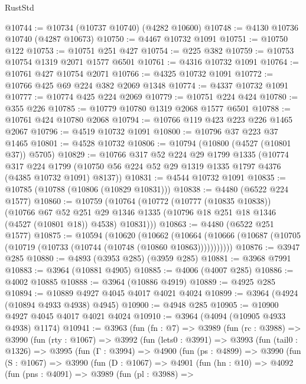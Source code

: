\begin{lexlean}{RustStd}
\begin{coremodule}
{\begin{coremodule}
{{{{{{{{{{{{{{{{{{{{{{{{{{{{{{{{{{{{{{@10744 := @10734 (@10737 @10740) (@4282 @10600)
@10748 := @4130 @10736 @10740 (@4287 @10673)
@10750 := @4467 @10732 @1091
@10751 := @10750 @122
@10753 := @10751 @251 @427
@10754 := @225 @382
@10759 := @10753 @10754 @1319 @2071 @1577 @6501
@10761 := @4316 @10732 @1091
@10764 := @10761 @427 @10754 @2071
@10766 := @4325 @10732 @1091
@10772 := @10766 @425 @69 @224 @382 @2069 @1348
@10774 := @4337 @10732 @1091
@10777 := @10774 @425 @224 @2069
@10779 := @10751 @224 @424
@10780 := @355 @226
@10785 := @10779 @10780 @1319 @2068 @1577 @6501
@10788 := @10761 @424 @10780 @2068
@10794 := @10766 @119 @423 @223 @226 @1465 @2067
@10796 := @4519 @10732 @1091
@10800 := @10796 @37 @223 @37 @1465
@10801 := @4528 @10732
@10806 := @10794 (@10800 (@4527 (@10801 @37)) @5705)
@10829 := @10766
    @317
    @52
    @224
    @29
    @1799
    @1335
    (@10774
      @317
      @224
      @1799
      (@10750 @56 @224 @52 @29 @1319 @1335 @1797 @4376 (@4385 @10732 @1091) @8137))
@10831 := @4544 @10732 @1091
@10835 := @10785 (@10788 (@10806 (@10829 @10831)))
@10838 := @4480 (@6522 @224 @1577)
@10860 := @10759
    (@10764
      (@10772
        (@10777 (@10835 @10838))
        (@10766
          @67
          @52
          @251
          @29
          @1346
          @1335
          (@10796 @18 @251 @18 @1346 (@4527 (@10801 @18)) @4538)
          @10831)))
@10863 := @4480 (@6522 @251 @1577)
@10875 := @10594
    (@10620
      (@10662
        (@10664 (@10666 (@10687 (@10705 (@10719 (@10733 (@10744 (@10748 (@10860 @10863)))))))))))
@10876 := @3947 @285
@10880 := @4893 (@3953 @285) (@3959 @285)
@10881 := @3968 @7991
@10883 := @3964 (@10881 @4905)
@10885 := @4006 (@4007 @285)
@10886 := @4002 @10885
@10888 := @3964 (@10886 @4919)
@10889 := @4925 @285
@10894 := @10889 @4927 @4045 @4017 @4021 @4024
@10899 := @3964 (@4924 (@10894 @4933 @4938) @4945)
@10900 := @4948 @285
@10905 := @10900 @4927 @4045 @4017 @4021 @4024
@10910 := @3964 (@4094 (@10905 @4933 @4938) @1174)
@10941 := @3963
    (fun (fn : @7) =>
    @3989
      (fun (rc : @3988) =>
      @3990
        (fun (rty : @1067) =>
        @3992
          (fun (lets0 : @3991) =>
          @3993
            (fun (tail0 : @1326) =>
            @3995
              (fun (Γ : @3994) =>
              @4900
                (fun (ps : @4899) =>
                @3990
                  (fun (S : @1067) =>
                  @3990
                    (fun (D : @1067) =>
                    @4901
                      (fun (hn : @10) =>
                      @4092
                        (fun (pns : @4091) =>
                        @3989
                          (fun (pl : @3988) =>
}}}}}}}}}}}}}}}}}}}}}}}}}}}}}}}}}}}}}}
\end{coremodule}}
\end{coremodule}
\end{lexlean}
